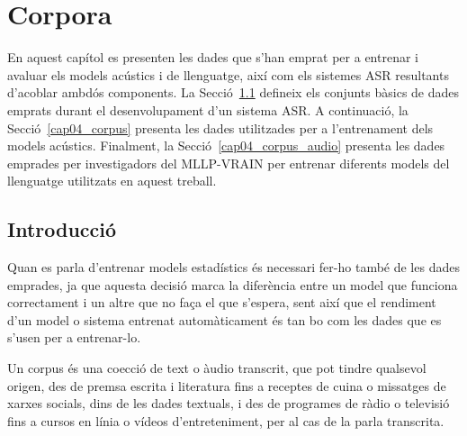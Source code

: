 
\chapter{Corpora}
\label{cap04__}


En aquest capítol es presenten les dades que s'han emprat per a entrenar i avaluar els models acústics i de llenguatge, així com els sistemes ASR resultants d'acoblar ambdós components.
La Secció~\ref{cap04_intro} defineix els conjunts bàsics de dades emprats durant el desenvolupament d'un sistema ASR.
A continuació, la Secció~\ref{cap04_corpus} presenta les dades utilitzades per a l'entrenament dels models acústics.
Finalment, la Secció~\ref{cap04_corpus_audio} presenta les dades emprades per investigadors del MLLP-VRAIN per entrenar diferents models del llenguatge utilitzats en aquest treball.

\section{Introducció}
\label{cap04_intro}
Quan es parla d'entrenar models estadístics és necessari fer-ho també de les dades emprades, ja que aquesta decisió marca la diferència entre un model que funciona correctament i un altre que no faça el que s'espera, sent així que el rendiment d'un model o sistema entrenat automàticament és tan bo com les dades que es s'usen per a entrenar-lo.

Un corpus és una co\lgem ecció de text o àudio transcrit, que pot tindre qualsevol origen, des de premsa escrita i literatura fins a receptes de cuina o missatges de xarxes socials, dins de les dades textuals, i des de programes de ràdio o televisió fins a cursos en línia o vídeos d'entreteniment, per al cas de la parla transcrita.

